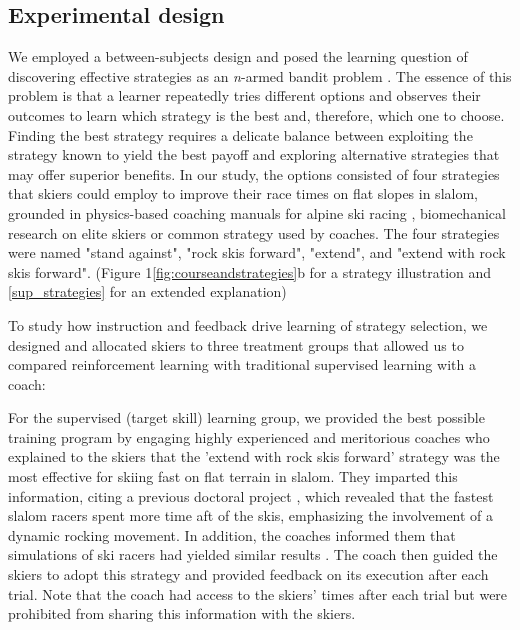 \documentclass[pdflatex,sn-mathphys-num]{sn-jnl}%
\theoremstyle{thmstyleone}%
\theoremstyle{thmstyletwo}%
\theoremstyle{thmstylethree}%
\begin{document}
\subsection{Experimental design}
We employed a between-subjects design and posed the learning question of discovering effective strategies as an \textit{n}-armed bandit problem \cite{sutton_reinforcement_2018}. The essence of this problem is that a learner repeatedly tries different options and observes their outcomes to learn which strategy is the best and, therefore, which one to choose. Finding the best strategy requires a delicate balance between exploiting the strategy known to yield the best payoff and exploring alternative strategies that may offer superior benefits. In our study, the options consisted of four strategies that skiers could employ to improve their race times on flat slopes in slalom, grounded in physics-based coaching manuals for alpine ski racing \cite{lemaster_skiers_1999, lemaster_ultimate_2010, lind_physics_2013}, biomechanical research on elite skiers \cite{reid_kinematic_2010, tjorhom_beskrivelse_2007, reid_alpine_2020, magelssen_is_2022}  or common strategy used by coaches. The four strategies were named "stand against", "rock skis forward", "extend", and "extend with rock skis forward". (Figure 1\ref{fig:courseandstrategies}b for a strategy illustration and \ref{sup_strategies} for an extended explanation)

To study how instruction and feedback drive learning of strategy selection, we designed and allocated skiers to three treatment groups that allowed us to compared reinforcement learning with traditional supervised learning with a coach:

For the supervised (target skill) learning group, we provided the best possible training program by engaging highly experienced and meritorious coaches who explained to the skiers that the 'extend with rock skis forward' strategy was the most effective for skiing fast on flat terrain in slalom. They imparted this information, citing a previous doctoral project \cite{reid_kinematic_2010}, which revealed that the fastest slalom racers spent more time aft of the skis, emphasizing the involvement of a dynamic rocking movement. In addition, the coaches informed them that simulations of ski racers had yielded similar results \cite{mote_accelerations_1983, lind_physics_2013}. The coach then guided the skiers to adopt this strategy and provided feedback on its execution after each trial. Note that the coach had access to the skiers' times after each trial but were prohibited from sharing this information with the skiers.
\end{document}
